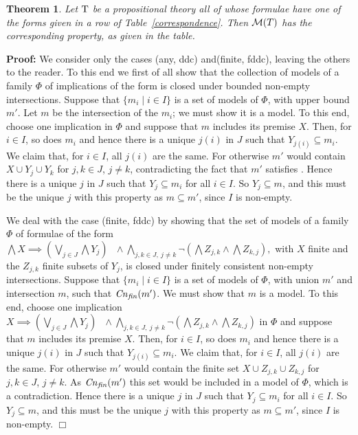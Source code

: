 \documentclass[twocolumn]{article}
\newtheorem{theo}{Theorem}
\newenvironment{theorem}[1]{\begin{theo} \rm \label{th-#1} }{\end{theo}}
\newenvironment{proof}{\begin{trivlist} \item[\hspace{\labelsep}\bf
Proof:]}{\hfill $\Box$\end{trivlist}}
\newcommand{\bigdvee}{~\makebox[0pt]{\Huge$\cdot$}\makebox[0pt]{$\bigvee$}~}
\begin{document}
\begin{theorem}{TtoC} Let ${\rm T}$ be a propositional theory
all of whose formulae have one of the forms given in a row of
Table~\ref{correspondence}. Then ${\cal M}(T)$ has the corresponding
property, as given in the table.
\end{theorem}
\begin{proof} We consider only the cases (any, ddc) and\linebreak[3]
(finite, fddc), leaving the others to the reader.  To this end we
first of all show that the collection of models of a family $\Phi$ of
implications of the form \plat{\bigwedge X \implies \bigdvee_{j\in
J}\bigwedge Y_{j}} is closed under bounded non-empty
intersections. Suppose that $\{ m_i\mid i \in I\}$ is a set of models
of $\Phi$, with upper bound $m'$. Let $m$ be the intersection of the
$m_i$; we must show it is a model. To this end, choose one implication
\plat{\bigwedge X \implies\bigdvee_{j\in J}\bigwedge Y_{j}} in $\Phi$ and
suppose that $m$ includes its premise $X$. Then, for $i\in I$, so does
$m_i$ and hence there is a unique $j(i)$ in $J$ such that $Y_{j(i)}
\subseteq m_i$. We claim that, for $i\in I$, all $j(i)$ are the same.
For otherwise $m'$ would contain $X \cup Y_j \cup Y_{k}$ for $j,k \mathbin\in J$,
$j\neq k$, contradicting the fact that $m'$ satisfies \plat{\bigwedge
X \implies\bigdvee_{j\in J}\bigwedge Y_{j}}.  Hence there is a unique
$j$ in $J$ such that $Y_{j}\subseteq m_i$ for all $i\in I$.  So
$Y_{j}\subseteq m$, and this must be the unique $j$ with this property
as $m \subseteq m'$, since $I$ is non-empty.

We deal with the case (finite, fddc) by showing that the set
of models of a family $\Phi$ of formulae of the form $\bigwedge X
\implies (\bigvee_{j\in J}\bigwedge Y_{j})\mbox{ }\wedge
\bigwedge_{j,k\in J,~j\neq k} \neg (\bigwedge Z_{j,k} \wedge \bigwedge
Z_{k,j}),$ with $X$ finite and the $Z_{j,k}$ finite subsets of $Y_j$,
is closed under finitely consistent non-empty intersections.
Suppose that $\{ m_i\mid i \in I\}$ is a set of models of $\Phi$, with
union $m'$ and intersection $m$, such that ${\it Cn}_{\it fin}(m')$.  We must show
that $m$ is a model. To this end, choose one implication
$X\implies (\bigvee_{j\in J}\bigwedge Y_{j})\mbox{ }\wedge
\bigwedge_{j,k\in J,~j\neq k}\neg (\bigwedge Z_{j,k} \wedge \bigwedge Z_{k,j})$
in $\Phi$ and suppose that $m$ includes its premise $X$. Then, for
$i\in I$, so does $m_i$ and hence there is a unique $j(i)$ in $J$ such
that $Y_{j(i)} \subseteq m_i$. We claim that, for $i\in I$, all $j(i)$
are the same.  For otherwise $m'$ would contain the finite set $X \cup
Z_{j,k} \cup Z_{k,j}$ for $j,k \in J$, $j\neq k$. As ${\it Cn}_{\it fin}(m')$ this set
would be included in a model of $\Phi$, which is a contradiction.
Hence there is a unique $j$ in $J$ such that $Y_{j}\subseteq m_i$ for
all $i\in I$.  So $Y_{j}\subseteq m$, and this must be the unique $j$
with this property as $m \subseteq m'$, since $I$ is non-empty.
\end{proof}
\end{document}
